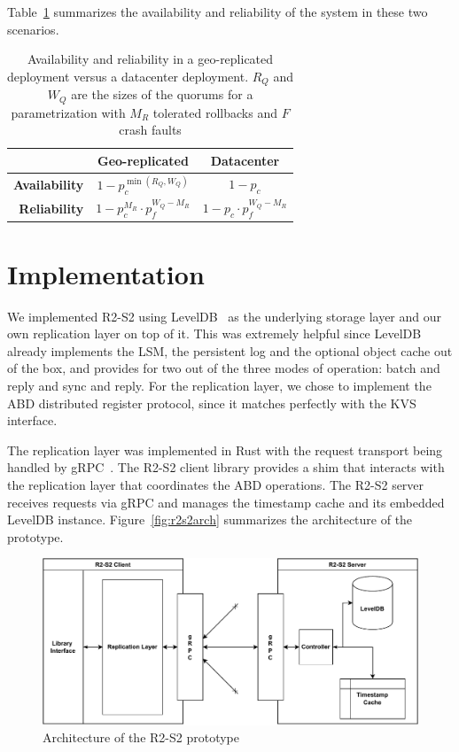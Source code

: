 Table~\ref{tab:parametrization} summarizes the availability and
reliability of the system in these two scenarios.

\begin{table}[ht]
    \centering
    \caption{Availability and reliability in a geo-replicated
    deployment versus a datacenter deployment. $R_Q$ and $W_Q$
    are the sizes of the quorums for a parametrization with $M_R$
    tolerated rollbacks and $F$ crash faults}\label{tab:parametrization}
    \begin{tabular}{|r||c|c|}
        \hline
        & \textbf{Geo-replicated} & \textbf{Datacenter} \\ \hline
        \textbf{Availability} & $1 - p_c^{\min(R_Q, W_Q)}$ & $1 - p_c$ \\ \hline
        \textbf{Reliability}  & $1 - p_c^{M_R} \cdot p_f^{W_Q - M_R}$ & $1 - p_c \cdot p_f^{W_Q - M_R}$ \\ \hline
    \end{tabular}\label{tab:parametrization}
\end{table}


\section{Implementation}\label{sec:r2s2implementation}

We implemented \ac{R2-S2} using LevelDB~\cite{leveldb} as the
underlying storage layer and our own replication layer on top of
it. This was extremely helpful since LevelDB already implements
the \ac{LSM}, the persistent log and the optional object cache
out of the box, and provides for two out of the three modes of
operation: batch and reply and sync and reply. For the
replication layer, we chose to implement the \ac{ABD} distributed
register protocol, since it matches perfectly with the \ac{KVS}
interface.

The replication layer was implemented in Rust with the request transport
being handled by gRPC~\cite{grpc}. The \ac{R2-S2} client library
provides a shim that interacts with the replication layer that
coordinates the \ac{ABD} operations. The \ac{R2-S2} server
receives requests via gRPC and manages the timestamp cache and
its embedded LevelDB instance. Figure~\ref{fig:r2s2arch}
summarizes the architecture of the prototype.

\begin{figure}[ht]
    \centering
    \includegraphics[width=\linewidth]{img/r2s2_arch}
    \caption{Architecture of the \ac{R2-S2} prototype}
\end{figure}

